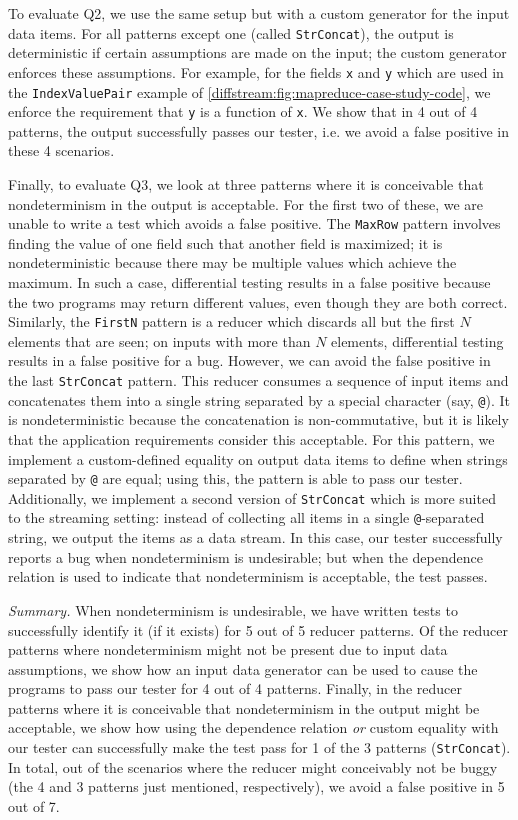 To evaluate Q2, we use the same setup but with a custom generator for the input data items.
For all patterns except one (called \texttt{StrConcat}), the output is deterministic if certain assumptions are made on the input;
the custom generator enforces these assumptions. For example, for the fields \texttt{x} and \texttt{y} which are used in the \texttt{IndexValuePair} example of \cref{diffstream:fig:mapreduce-case-study-code}, we enforce the requirement that \texttt{y} is a function of \texttt{x}.
We show that in 4 out of 4 patterns, the output successfully passes our tester, i.e. we avoid a false positive in these 4 scenarios.

Finally, to evaluate Q3, we look at three patterns where it is conceivable that nondeterminism in the output is acceptable.
For the first two of these, we are unable to write a test which avoids a false positive.
The \texttt{MaxRow} pattern involves finding the value of one field such that another field is maximized; it is nondeterministic because there may be multiple values which achieve the maximum. In such a case, differential testing results in a false positive because the two programs may return different values, even though they are both correct. Similarly, the \texttt{FirstN} pattern is a reducer which discards all but the first $N$ elements that are seen; on inputs with more than $N$ elements, differential testing results in a false positive for a bug.
However, we can avoid the false positive in the last \texttt{StrConcat} pattern. This reducer consumes a sequence of input items and concatenates them into a single string separated by a special character (say, \texttt{@}). It is nondeterministic because the concatenation is non-commutative, but it is likely that the application requirements consider this acceptable. For this pattern, we implement a custom-defined equality on output data items to define when strings separated by \texttt{@} are equal; using this, the pattern is able to pass our tester.
Additionally, we implement a second version of \texttt{StrConcat} which is more suited to the streaming setting: instead of collecting all items in a single \texttt{@}-separated string, we output the items as a data stream. In this case, our tester successfully reports a bug when nondeterminism is undesirable; but when the dependence relation is used to indicate that nondeterminism is acceptable, the test passes.

\emph{Summary.}
When nondeterminism is undesirable, we have written tests to successfully identify it (if it exists) for 5 out of 5 reducer patterns. Of the reducer patterns where nondeterminism might not be present due to input data assumptions, we show how an input data generator can be used to cause the programs to pass our tester for 4 out of 4 patterns. Finally, in the reducer patterns where it is conceivable that nondeterminism in the output might be acceptable, we show how using the dependence relation \emph{or} custom equality with our tester can successfully make the test pass for 1 of the 3 patterns (\texttt{StrConcat}). In total, out of the scenarios where the reducer might conceivably not be buggy (the 4 and 3 patterns just mentioned, respectively), we avoid a false positive in 5 out of 7.

